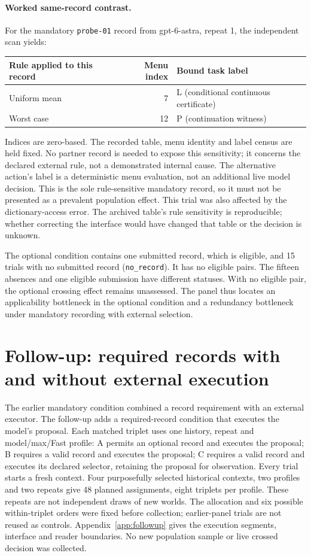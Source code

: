 \paragraph{Worked same-record contrast.}
For the mandatory \texttt{probe-01} record from gpt-6-astra, repeat 1,
the independent scan yields:
\begin{center}
\begin{tabular}{lrl}\toprule
Rule applied to this record & Menu index & Bound task label\\\midrule
Uniform mean & 7 & L (conditional continuous certificate)\\
Worst case & 12 & P (continuation witness)\\\bottomrule
\end{tabular}
\end{center}
Indices are zero-based. The recorded table, menu identity and label census
are held fixed. No partner record is needed to expose this sensitivity;
it concerns the declared external rule, not a demonstrated internal cause.
The alternative action's label is a deterministic menu evaluation, not an
additional live model decision. This is the sole rule-sensitive mandatory
record, so it must not be presented as a prevalent population effect.
This trial was also affected by the dictionary-access error.
The archived table's rule sensitivity is reproducible; whether correcting
the interface would have changed that table or the decision is unknown.

The optional condition contains one submitted record, which is eligible,
and 15 trials with no submitted record (\texttt{no\_record}). It has no
eligible pairs. The fifteen absences and one eligible submission have different statuses.
With no eligible pair, the optional crossing effect remains unassessed.
The panel thus locates an applicability bottleneck in the optional condition
and a redundancy bottleneck under mandatory recording with external selection.

\section{Follow-up: required records with and without external execution}
\label{sec:followup}
The earlier mandatory condition combined a record requirement with an external
executor. The follow-up adds a required-record condition that executes the
model's proposal. Each matched triplet uses one history, repeat and
model/max/Fast profile: A permits an optional record and executes the proposal;
B requires a valid record and executes the proposal; C requires a valid record
and executes its declared selector, retaining the proposal for observation.
Every trial starts a fresh context. Four purposefully selected historical
contexts, two profiles and two repeats give 48 planned assignments, eight
triplets per profile. These repeats are not independent draws of new worlds.
The allocation and six possible within-triplet orders were fixed before
collection; earlier-panel trials are not reused as controls.
Appendix~\ref{app:followup} gives the execution segments, interface and reader
boundaries. No new population sample or live crossed decision was collected.

